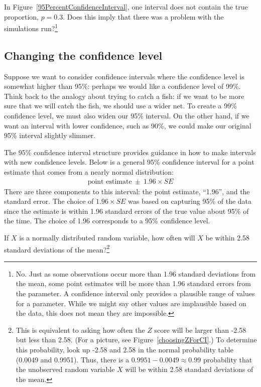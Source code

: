 \begin{exercise}
In Figure~\ref{95PercentConfidenceInterval}, one interval does not contain the true proportion, $p = 0.3$. Does this imply that there was a problem with the simulations run?\footnote{No. Just as some observations occur more than 1.96 standard deviations from the mean, some point estimates will be more than 1.96 standard errors from the parameter. A confidence interval only provides a plausible range of values for a parameter. While we might say other values are implausible based on the data, this does not mean they are impossible.}
\end{exercise}


\subsection{Changing the confidence level}
\label{changingTheConfidenceLevelSection}


Suppose we want to consider confidence intervals where the confidence level is somewhat higher than 95\%: perhaps we would like a confidence level of 99\%. Think back to the analogy about trying to catch a fish: if we want to be more sure that we will catch the fish, we should use a wider net. To create a 99\% confidence level, we must also widen our 95\% interval. On the other hand, if we want an interval with lower confidence, such as 90\%, we could make our original 95\% interval slightly slimmer.

The 95\% confidence interval structure provides guidance in how to make intervals with new confidence levels. Below is a general 95\% confidence interval for a point estimate that comes from a nearly normal distribution:
\begin{eqnarray}
\text{point estimate}\ \pm\ 1.96\times SE
\end{eqnarray}
There are three components to this interval: the point estimate, ``1.96'', and the standard error. The choice of $1.96\times SE$ was based on capturing 95\% of the data since the estimate is within 1.96 standard errors of the true value about 95\% of the time. The choice of 1.96 corresponds to a 95\% confidence level. 

\begin{exercise} \label{leadInForMakingA99PercentCIExercise}
If $X$ is a normally distributed random variable, how often will $X$ be within 2.58 standard deviations of the mean?\footnote{This is equivalent to asking how often the $Z$ score will be larger than -2.58 but less than 2.58. (For a picture, see Figure~\ref{choosingZForCI}.) To determine this probability, look up -2.58 and 2.58 in the normal probability table (0.0049 and 0.9951). Thus, there is a $0.9951-0.0049 \approx 0.99$ probability that the unobserved random variable $X$ will be within 2.58 standard deviations of the mean.}
\end{exercise}

